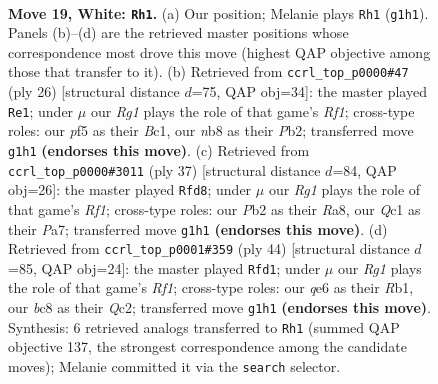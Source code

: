 \documentclass[11pt]{article}
\begin{document}
\clearpage

\begin{figure}[p]\centering
\begin{subfigure}{0.46\textwidth}\centering
\resizebox{\linewidth}{!}{%
\newchessgame
\chessboard[
  setfen={rnb1k1r1/8/3pq1p1/pp3p1p/3B4/2N5/PPP2PPP/R1Q2KR1 w q - 0 19},
  showmover=false,
  pgfstyle=straightmove, color=movearrow, markmove={g1-h1}
]}
\caption{}
\end{subfigure}\hfill
\begin{subfigure}{0.46\textwidth}\centering
\resizebox{\linewidth}{!}{%
\newchessgame
\chessboard[
  setfen={r3k2r/1b2qppp/p2p4/1p6/4n3/1P3N2/PP3PPP/R1BQ1RK1 w kq - 0 14},
  showmover=false,
  pgfstyle=straightmove, color=movearrow, markmove={f1-e1}
]}
\caption{}
\end{subfigure}
\\[4pt]
\begin{subfigure}{0.46\textwidth}\centering
\resizebox{\linewidth}{!}{%
\newchessgame
\chessboard[
  setfen={r4rk1/ppq1nppp/3p3b/4p3/4P2P/PN1Q2PB/1PP2P2/3RK2R b K - 2 19},
  showmover=false,
  pgfstyle=straightmove, color=movearrow, markmove={f8-d8}
]}
\caption{}
\end{subfigure}\hfill
\begin{subfigure}{0.46\textwidth}\centering
\resizebox{\linewidth}{!}{%
\newchessgame
\chessboard[
  setfen={3r1r1k/pb3pp1/2q1p2p/8/P1p5/2P1PNP1/2Q2PP1/1R3RK1 w - - 2 23},
  showmover=false,
  pgfstyle=straightmove, color=movearrow, markmove={f1-d1}
]}
\caption{}
\end{subfigure}
\caption{\textbf{Move 19, White: \texttt{Rh1}.} (a) Our position; Melanie plays \texttt{Rh1} (\texttt{g1h1}). Panels (b)--(d) are the retrieved master positions whose correspondence most drove this move (highest QAP objective among those that transfer to it). (b) Retrieved from \texttt{ccrl\_top\_p0000\#47} (ply 26) [structural distance $d$=75, QAP obj=34]: the master played \texttt{Re1}; under $\mu$ our \emph{Rg1} plays the role of that game's \emph{Rf1}; cross-type roles: our \emph{p}f5 as their \emph{B}c1, our \emph{n}b8 as their \emph{P}b2; transferred move \texttt{g1h1} \textbf{(endorses this move)}. (c) Retrieved from \texttt{ccrl\_top\_p0000\#3011} (ply 37) [structural distance $d$=84, QAP obj=26]: the master played \texttt{Rfd8}; under $\mu$ our \emph{Rg1} plays the role of that game's \emph{Rf1}; cross-type roles: our \emph{P}b2 as their \emph{R}a8, our \emph{Q}c1 as their \emph{P}a7; transferred move \texttt{g1h1} \textbf{(endorses this move)}. (d) Retrieved from \texttt{ccrl\_top\_p0001\#359} (ply 44) [structural distance $d$=85, QAP obj=24]: the master played \texttt{Rfd1}; under $\mu$ our \emph{Rg1} plays the role of that game's \emph{Rf1}; cross-type roles: our \emph{q}e6 as their \emph{R}b1, our \emph{b}c8 as their \emph{Q}c2; transferred move \texttt{g1h1} \textbf{(endorses this move)}. Synthesis: 6 retrieved analogs transferred to \texttt{Rh1} (summed QAP objective 137, the strongest correspondence among the candidate moves); Melanie committed it via the \texttt{search} selector.}
\label{fig:thought-m36}
\end{figure}
\end{document}

